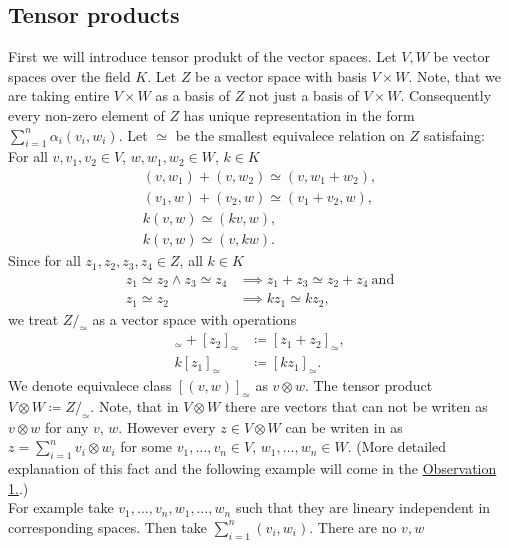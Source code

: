 \documentclass[a4paper, 12pt]{report}
\begin{document}
\subsection{Tensor products}
%
First we will introduce tensor produkt of the vector spaces. Let $V, W$ be vector spaces over the field $K$.
Let $Z$ be a vector space with basis $V \times W$. Note, that we are taking entire $V \times W$ as a basis
of $Z$ not just a basis of $V \times W$. Consequently every non-zero element of $Z$ has unique
representation in the form
$\displaystyle\sum^n_{i = 1}\alpha_i(v_i,w_i)$.
Let $\simeq$ be the smallest equivalece relation on $Z$ satisfaing: \\
%
For all $v,v_1,v_2 \in V$, $w, w_1, w_2 \in W$, $k \in K$
\begin{gather*}
(v,w_1) + (v, w_2) \simeq (v, w_1 + w_2), \\
(v_1,w) +(v_2, w) \simeq (v_1+v_2,w), \\
k(v, w) \simeq (kv, w), \\
k(v, w) \simeq (v, kw).
\end{gather*}
Since for all $z_1, z_2, z_3, z_4 \in Z$, all $k \in K$
\begin{align*}
z_1 \simeq z_2 \land z_3 \simeq z_4 &\implies z_1 + z_3 \simeq z_2 + z_4 \mathrm{\ and} \\
z_1 \simeq z_2 &\implies kz_1 \simeq kz_2,
\end{align*}
%
we treat $Z/_\simeq$ as a vector space with operations
%
\begin{align*}
[z_1]_\simeq + [z_2]_\simeq &\coloneqq [z_1 + z_2]_\simeq, \\
k[z_1]_\simeq &\coloneqq [kz_1]_\simeq.
\end{align*}
%
We denote equivalece class $[(v,w)]_\simeq$ as $v \otimes w$.
The tensor product $V \otimes W \coloneqq Z/_\simeq$.
Note, that in $V \otimes W$ there are vectors that can not be writen as $v \otimes w$ for any $v$, $w$.
However every $z \in V \otimes W$ can be writen in as $z =\displaystyle\sum^n_{i = 1}v_i \otimes w_i$
for some $v_1, \dots, v_n \in V$, $w_1, \dots, w_n \in W$.
(More detailed explanation of this fact and the following example will come in the
\hyperref[observation:1]{Observation 1.}.)\\
For example take $v_1,\dots, v_n, w_1, \dots, w_n$ such that they are lineary independent
in corresponding spaces.
Then take $\displaystyle\sum^n_{i=1}(v_i,w_i)$. There are no $v, w$
\end{document}
